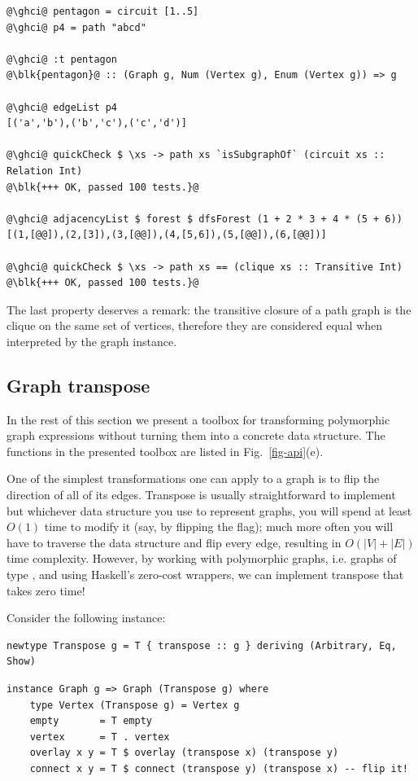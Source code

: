\begin{verbatim}
@\ghci@ pentagon = circuit [1..5]
@\ghci@ p4 = path "abcd"

@\ghci@ :t pentagon
@\blk{pentagon}@ :: (Graph g, Num (Vertex g), Enum (Vertex g)) => g

@\ghci@ edgeList p4
[('a','b'),('b','c'),('c','d')]

@\ghci@ quickCheck $ \xs -> path xs `isSubgraphOf` (circuit xs :: Relation Int)
@\blk{+++ OK, passed 100 tests.}@

@\ghci@ adjacencyList $ forest $ dfsForest (1 + 2 * 3 + 4 * (5 + 6))
[(1,[@@]),(2,[3]),(3,[@@]),(4,[5,6]),(5,[@@]),(6,[@@])]

@\ghci@ quickCheck $ \xs -> path xs == (clique xs :: Transitive Int)
@\blk{+++ OK, passed 100 tests.}@
\end{verbatim}

The last property deserves a remark: the transitive closure of a path graph
is the clique on the same set of vertices, therefore they are considered equal
when interpreted by the  graph instance.

\subsection{Graph transpose}

In the rest of this section we present a toolbox for transforming polymorphic graph
expressions without turning them into a concrete data structure. The functions in the
presented toolbox are listed in Fig.~\ref{fig-api}(e).

One of the simplest transformations one can apply to a graph is to flip the
direction of all of its edges. Transpose is usually straightforward to implement but
whichever data structure you use to represent graphs, you will spend at least
$O(1)$ time to modify it (say, by flipping the  flag);
much more often you will have to traverse the data structure and flip every edge,
resulting in $O(|V|+|E|)$ time complexity. However, by working with polymorphic
graphs, i.e. graphs of type , and using Haskell's
zero-cost  wrappers, we can implement transpose that takes zero time!

Consider the following  instance:

\begin{verbatim}
newtype Transpose g = T { transpose :: g } deriving (Arbitrary, Eq, Show)
\end{verbatim}
\vspace{1mm}
\begin{verbatim}
instance Graph g => Graph (Transpose g) where
    type Vertex (Transpose g) = Vertex g
    empty       = T empty
    vertex      = T . vertex
    overlay x y = T $ overlay (transpose x) (transpose y)
    connect x y = T $ connect (transpose y) (transpose x) -- flip it!
\end{verbatim}

